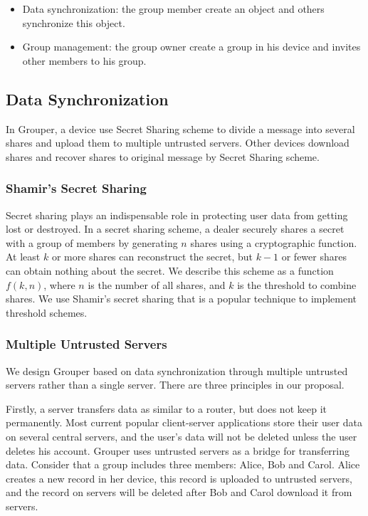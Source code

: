 \documentclass[twocolumn,10pt]{article}
\begin{document}
\begin{itemize}
	\setlength{\itemsep}{1pt}
	\setlength{\parskip}{0pt}
	\setlength{\parsep}{0pt}
	\item Data synchronization: the group member create an object and others synchronize this object.
	\item Group management: the group owner create a group in his device and invites other members to his group.
\end{itemize}

\subsection{Data Synchronization}

In Grouper, a device use Secret Sharing scheme to divide a message into several shares and upload them to multiple untrusted servers. Other devices download shares and recover shares to original message by Secret Sharing scheme.

\subsubsection{Shamir's Secret Sharing}
Secret sharing plays an indispensable role in protecting user data from getting lost or destroyed. In a secret sharing scheme, a dealer securely shares a secret with a group of members by generating $n$ shares using a cryptographic function\cite{smith2013layered}. At least $k$ or more shares can reconstruct the secret, but $k-1$ or fewer shares can obtain nothing about the secret\cite{pang2005new}. We describe this scheme as a function $f(k, n)$, where $n$ is the number of all shares, and $k$ is the threshold to combine shares.  We use Shamir's secret sharing that  is a popular technique to implement threshold schemes.

\subsubsection{Multiple Untrusted Servers}

We design Grouper based on data synchronization through multiple untrusted servers rather than a single server. There are three principles in our proposal. 

Firstly, a server transfers data as similar to a router, but does not keep it permanently. Most current popular client-server applications store their user data on several central servers, and the user's data will not be deleted unless the user deletes his account. Grouper uses untrusted servers as a bridge for transferring data. Consider that a group includes three members: Alice, Bob and Carol. Alice creates a new record in her device, this record is uploaded to untrusted servers, and the record on servers will be deleted after Bob and Carol download it from servers.
\end{document}
